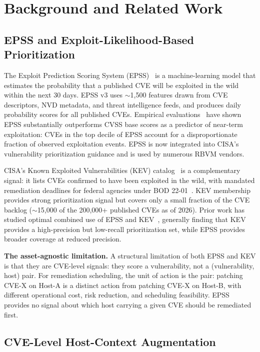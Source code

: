\section{Background and Related Work}

\subsection{EPSS and Exploit-Likelihood-Based Prioritization}

The Exploit Prediction Scoring System (EPSS)~\cite{jacobs2021epss} is a machine-learning model that estimates the probability that a published CVE will be exploited in the wild within the next 30 days. EPSS v3 uses $\sim$1,500 features drawn from CVE descriptors, NVD metadata, and threat intelligence feeds, and produces daily probability scores for all published CVEs. Empirical evaluations~\cite{jacobs2020improving} have shown EPSS substantially outperforms CVSS base scores as a predictor of near-term exploitation: CVEs in the top decile of EPSS account for a disproportionate fraction of observed exploitation events. EPSS is now integrated into CISA's vulnerability prioritization guidance and is used by numerous RBVM vendors.

CISA's Known Exploited Vulnerabilities (KEV) catalog~\cite{cisa2026kev} is a complementary signal: it lists CVEs confirmed to have been exploited in the wild, with mandated remediation deadlines for federal agencies under BOD 22-01~\cite{cisa2021bod2201}. KEV membership provides strong prioritization signal but covers only a small fraction of the CVE backlog ($\sim$15,000 of the 200,000+ published CVEs as of 2026). Prior work has studied optimal combined use of EPSS and KEV~\cite{paper1vulnprio}, generally finding that KEV provides a high-precision but low-recall prioritization set, while EPSS provides broader coverage at reduced precision.

\textbf{The asset-agnostic limitation.} A structural limitation of both EPSS and KEV is that they are CVE-level signals: they score a vulnerability, not a (vulnerability, host) pair. For remediation scheduling, the unit of action is the pair: patching CVE-X on Host-A is a distinct action from patching CVE-X on Host-B, with different operational cost, risk reduction, and scheduling feasibility. EPSS provides no signal about which host carrying a given CVE should be remediated first.

\subsection{CVE-Level Host-Context Augmentation}

